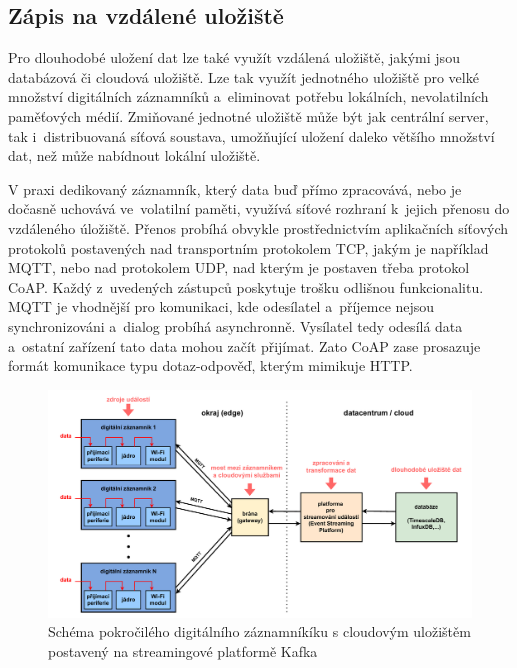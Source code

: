 \subsection{Zápis na vzdálené uložiště}
\label{zapis_na_vzdalene_uloziste}
Pro dlouhodobé uložení dat lze také využít vzdálená uložiště, jakými jsou databázová či cloudová uložiště. Lze tak využít jednotného uložiště pro velké množství digitálních záznamníků a~eliminovat potřebu lokálních, nevolatilních paměťových médií. Zmiňované jednotné uložiště může být jak centrální server, tak i~distribuovaná síťová soustava, umožňující uložení daleko většího množství dat, než může nabídnout lokální uložiště.~\cite{springer_analysis_time_series_db_edge_computing, iot_datalogger_with_timestamping}

V praxi dedikovaný záznamník, který data buď přímo zpracovává, nebo je dočasně uchovává ve~volatilní paměti, využívá síťové rozhraní k~jejich přenosu do vzdáleného úložiště. Přenos probíhá obvykle prostřednictvím aplikačních síťových protokolů postavených nad transportním protokolem TCP, jakým je například MQTT, nebo nad protokolem UDP, nad kterým je postaven třeba protokol CoAP. Každý z~uvedených zástupců poskytuje trošku odlišnou funkcionalitu. MQTT je vhodnější pro komunikaci, kde odesílatel a~příjemce nejsou synchronizováni a~dialog probíhá asynchronně. Vysílatel tedy odesílá data a~ostatní zařízení tato data mohou začít přijímat. Zato CoAP zase prosazuje formát komunikace typu dotaz-odpověď, kterým mimikuje HTTP.~\cite{emq_mqtt_vs_coap, smart_datalogger_data_acquisition_cpu, iot_datalogger_with_timestamping}


\begin{figure}[h]
    \centering
    \includegraphics[width=1.00\textwidth]{obrazky-figures/advanced_architecture_of_datalogging.pdf}
    
    \caption{Schéma pokročilého digitálního záznamníkíku s cloudovým uložištěm postavený na streamingové platformě Kafka~\cite{influxdata_advanced_datalogging_mmqt, confluent_advanced_datalogging}}
    \label{fig:advanced-architecture-of-datalogging}
\end{figure}

